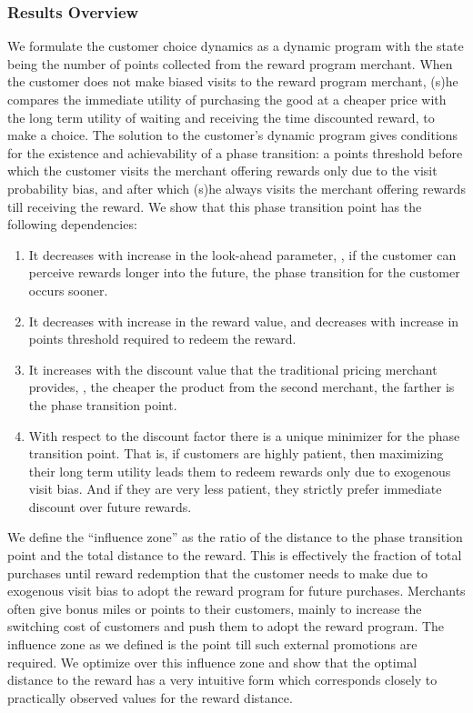 \subsubsection{Results Overview}
We formulate the customer choice dynamics as a dynamic program with the state being the number of points collected from the reward program merchant.
When the customer does not make biased visits to the reward program merchant, (s)he compares the immediate utility of purchasing the good at a cheaper price with the long term utility of waiting and receiving the time discounted reward, to make a choice. 
The solution to the customer's dynamic program gives conditions for the existence and achievability of a phase transition: a points threshold before which the customer visits the merchant offering rewards only due to the visit probability bias, and after which (s)he always visits the merchant offering rewards till receiving the reward.
We show that this phase transition point has the following dependencies:
\begin{enumerate}
\item It decreases with increase in the look-ahead parameter, \ie, if the customer can perceive rewards longer into the future, the phase transition for the customer occurs sooner.
\item It decreases with increase in the reward value, and decreases with increase in points threshold required to redeem the reward. 
\item It increases with the discount value that the traditional pricing merchant provides, \ie, the cheaper the product from the second merchant, the farther is the phase transition point. 
\item With respect to the discount factor there is a unique minimizer for the phase transition point. That is, if customers are highly patient, then maximizing their long term utility leads them to redeem rewards only due to exogenous visit bias.
And if they are very less patient, they strictly prefer immediate discount over future rewards.
\end{enumerate}

We define the ``influence zone'' as the ratio of the distance to the phase transition  point and the total distance to the reward.
This is effectively the fraction of total purchases until reward redemption that the customer needs to make due to exogenous visit bias to adopt the reward program for future purchases.
Merchants often give bonus miles or points to their customers, mainly to increase the switching cost of customers and push them to adopt the reward program.
The influence zone as we defined is the point till such external promotions are required.
We optimize over this influence zone and show that the optimal distance to the reward has a very intuitive form which corresponds closely to practically observed values for the reward distance.

